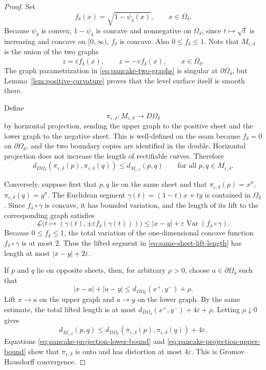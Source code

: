\documentclass[10pt,a4paper]{amsart}
\newcommand{\Om}{\Omega}
\newcommand{\eps}{\varepsilon}
\begin{document}
\begin{proof}
Set
$$
f_\delta(x)=\sqrt{1-\psi_\delta(x)},
\qquad x\in\overline{\Om_\delta}.
$$
Because $\psi_\delta$ is convex, $1-\psi_\delta$ is concave and nonnegative on
$\Om_\delta$; since $t\mapsto\sqrt t$ is increasing and concave on
$[0,\infty)$, $f_\delta$ is concave.  Also $0\le f_\delta\le1$.
Note that $M_{\eps,\delta}$ is the union of the two graphs
\begin{equation}\label{eq:pancake-two-graphs}
z=\eps f_\delta(x),
\qquad
z=-\eps f_\delta(x),
\qquad
x\in\overline{\Om_\delta}.
\end{equation}
The graph parametrization in \eqref{eq:pancake-two-graphs} is singular at
$\partial\Om_\delta$, but Lemma~\ref{lem:positive-curvature} proves that the
level surface itself is smooth there.

Define
$$
\pi_{\eps,\delta}:M_{\eps,\delta}\to D\Om_\delta
$$
by horizontal projection, sending the upper graph to the positive sheet and the
lower graph to the negative sheet.  This is well-defined on the seam because
$f_\delta=0$ on $\partial\Om_\delta$, and the two boundary copies are identified
in the double.  Horizontal projection does not increase the length of rectifiable
curves.  Therefore
\begin{equation}\label{eq:pancake-projection-lower-bound}
d_{D\Om_\delta}(\pi_{\eps,\delta}(p),\pi_{\eps,\delta}(q))
\le d_{M_{\eps,\delta}}(p,q)
\qquad\text{for all }p,q\in M_{\eps,\delta}.
\end{equation}

Conversely, suppose first that $p,q$ lie on the same sheet and that
$\pi_{\eps,\delta}(p)=x^\sigma$, $\pi_{\eps,\delta}(q)=y^\sigma$.  The Euclidean
segment $\gamma(t)=(1-t)x+ty$ is contained in $\Om_\delta$.  Since
$f_\delta\circ\gamma$ is concave, it has bounded variation, and the length of its
lift to the corresponding graph satisfies
\begin{equation}\label{eq:same-sheet-lift-length}
\mathcal L\bigl(t\mapsto(\gamma(t),\pm\eps f_\delta(\gamma(t)))\bigr)
\le |x-y|+\eps\operatorname{Var}(f_\delta\circ\gamma).
\end{equation}
Because $0\le f_\delta\le1$, the total variation of the one-dimensional concave
function $f_\delta\circ\gamma$ is at most $2$.  Thus the lifted segment in
\eqref{eq:same-sheet-lift-length} has length at most $|x-y|+2\eps$.

If $p$ and $q$ lie on opposite sheets, then, for arbitrary $\rho>0$, choose
$a\in\partial\Om_\delta$ such that
$$
|x-a|+|a-y|\le d_{D\Om_\delta}(x^+,y^-)+\rho.
$$
Lift $x\to a$ on the upper graph and $a\to y$ on the lower graph.  By the same
estimate, the total lifted length is at most
$ d_{D\Om_\delta}(x^+,y^-)+4\eps+\rho $.  Letting $\rho\downarrow0$ gives
\begin{equation}\label{eq:pancake-projection-upper-bound}
d_{M_{\eps,\delta}}(p,q)
\le d_{D\Om_\delta}(\pi_{\eps,\delta}(p),\pi_{\eps,\delta}(q))+4\eps.
\end{equation}
Equations \eqref{eq:pancake-projection-lower-bound} and
\eqref{eq:pancake-projection-upper-bound} show that $\pi_{\eps,\delta}$ is onto
and has distortion at most $4\eps$.  This is Gromov--Hausdorff convergence.


\end{proof}
\end{document}
